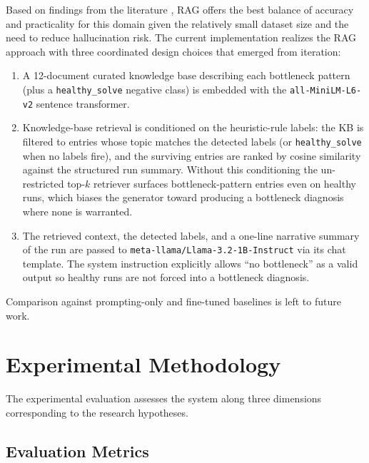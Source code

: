 \documentclass[11pt]{article}
\begin{document}
Based on findings from the literature \cite{akhtar2025llmbasedeventloganalysis}, RAG offers the best balance of accuracy and practicality for this domain given the relatively small dataset size and the need to reduce hallucination risk. The current implementation realizes the RAG approach with three coordinated design choices that emerged from iteration:
\begin{enumerate}
    \item A 12-document curated knowledge base describing each bottleneck pattern (plus a \texttt{healthy\_solve} negative class) is embedded with the \texttt{all-MiniLM-L6-v2} sentence transformer.
    \item Knowledge-base retrieval is conditioned on the heuristic-rule labels: the KB is filtered to entries whose topic matches the detected labels (or \texttt{healthy\_solve} when no labels fire), and the surviving entries are ranked by cosine similarity against the structured run summary. Without this conditioning the un-restricted top-$k$ retriever surfaces bottleneck-pattern entries even on healthy runs, which biases the generator toward producing a bottleneck diagnosis where none is warranted.
    \item The retrieved context, the detected labels, and a one-line narrative summary of the run are passed to \texttt{meta-llama/Llama-3.2-1B-Instruct} via its chat template. The system instruction explicitly allows ``no bottleneck'' as a valid output so healthy runs are not forced into a bottleneck diagnosis.
\end{enumerate}
Comparison against prompting-only and fine-tuned baselines is left to future work.

\section{Experimental Methodology}
\label{sec:experiments}

The experimental evaluation assesses the system along three dimensions corresponding to the research hypotheses.

\subsection{Evaluation Metrics}
\end{document}
